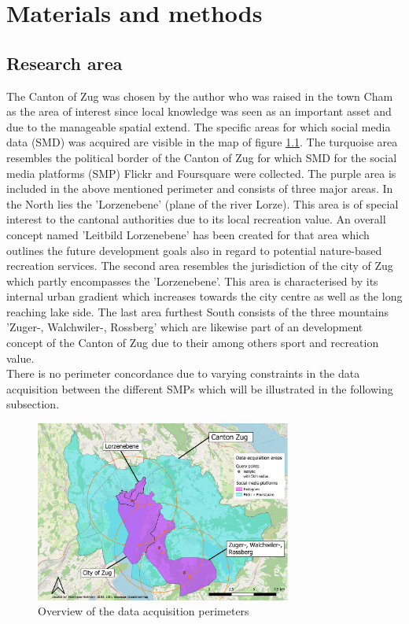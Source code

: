 \chapter{Materials and methods} \label{material_methods}

\section{Research area} \label{research_area}
The Canton of Zug was chosen by the author who was raised in the town Cham as the area of interest since local knowledge was seen as an important asset and due to the manageable spatial extend. The specific areas for which social media data (SMD) was acquired are visible in the map of figure \ref{fig:research_area}. The turquoise area resembles the political border of the Canton of Zug for which SMD for the social media platforms (SMP) Flickr and Foursquare were collected. The purple area is included in the above mentioned perimeter and consists of three major areas. In the North lies the 'Lorzenebene' (plane of the river Lorze). This area is of special interest to the cantonal authorities due to its local recreation value. An overall concept named 'Leitbild Lorzenebene'  \parencite{BaudirektiondesKantonsZug2012} has been created for that area which outlines the future development goals also in regard to potential nature-based recreation services. The second area resembles the jurisdiction of the city of Zug which partly encompasses the 'Lorzenebene'. This area is characterised by its internal urban gradient which increases towards the city centre as well as the long reaching lake side. The last area furthest South consists of the three mountains 'Zuger-, Walchwiler-, Rossberg' which are likewise part of an development concept \parencite{Berchtold2011} of the Canton of Zug due to their among others sport and recreation value. \\
There is no perimeter concordance due to varying constraints in the data acquisition between the different SMPs which will be illustrated in the following subsection.

\begin{figure}[h]
   \centering
   \includegraphics[width=0.75\textwidth]{img/overview_research_area_w_Lorzenebene}
   \caption{Overview of the data acquisition perimeters}
   \label{fig:research_area}
\end{figure}


